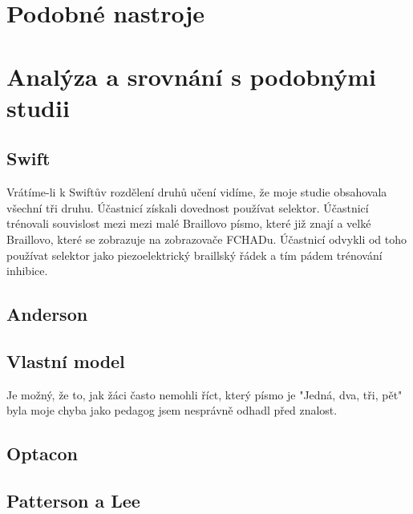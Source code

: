 \section{Podobné nastroje}

\section{Analýza a srovnání s podobnými studii}

\subsection{Swift}
Vrátíme-li k Swiftův rozdělení druhů učení vidíme, že moje studie obsahovala všechní tři druhu.  Účastnicí získali dovednost používat selektor.  Účastnicí trénovali souvislost mezi mezi malé Braillovo písmo, které již znají a velké Braillovo, které se zobrazuje na zobrazovače FCHADu.  Účastnicí odvykli od toho používat selektor jako piezoelektrický braillský řádek a tím pádem trénování inhibice.

\subsection{Anderson}
\subsection{Vlastní model}
Je možný, že to, jak žáci často nemohli říct, který písmo je "Jedná, dva, tři, pět" byla moje chyba jako pedagog jsem nesprávně odhadl před znalost.
\subsection{Optacon}
\subsection{Patterson a Lee}

